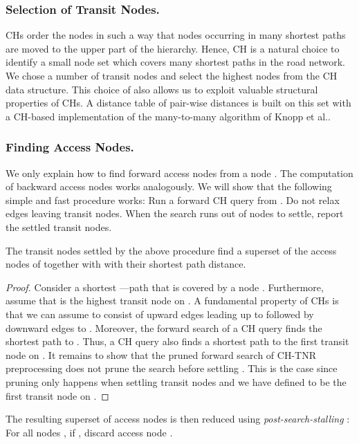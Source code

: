 \documentclass{llncs}
\newcommand{\etal}{et al.\xspace}
\begin{document}
\subsubsection{Selection of Transit Nodes.}
CHs order the  nodes in such a way that nodes occurring in many shortest paths are moved to the upper part of the hierarchy.
Hence, CH is a natural choice to identify a small node set which covers many shortest paths in the road network.
We chose a number of transit nodes  and select the highest  nodes from the CH data structure.
This choice of  also allows us to exploit valuable structural properties of CHs. 
A distance table of pair-wise distances is built on this set with a CH-based implementation of the many-to-many algorithm of Knopp \etal \cite{ksssw-cmmsp-07}. 

\subsubsection{Finding Access Nodes.}
We only explain how to find forward access nodes from a node . The computation of backward access nodes works analogously. We will show that the following simple and fast procedure works: Run a forward CH query from . Do not relax edges leaving transit nodes. When the search runs out of nodes to settle, report the settled transit nodes. 

\begin{lemma}\label{lem:findAccess}
The transit nodes settled by the above procedure find a superset of the access nodes of  together with  with their shortest path distance.
\begin{proof}


Consider a shortest ---path  that is covered by a node .
Furthermore, assume that  is the highest transit node on . 
A fundamental property of CHs is that we can assume  to consist of upward edges leading up to  followed by downward edges to . 
Moreover, the forward search of a CH query finds the shortest path to . 
Thus, a CH query also finds a shortest path to the first transit node  on . 
It remains to show that the pruned forward search of CH-TNR preprocessing does not prune the search before settling . 
This is the case since pruning only happens when settling transit nodes and we have defined  to be the first transit node on . 




\end{proof}
\end{lemma}

The resulting superset of access nodes is then reduced using \emph{post-search-stalling} \cite{s-rprn-08}:
For all nodes , if , discard access node .
\end{document}
